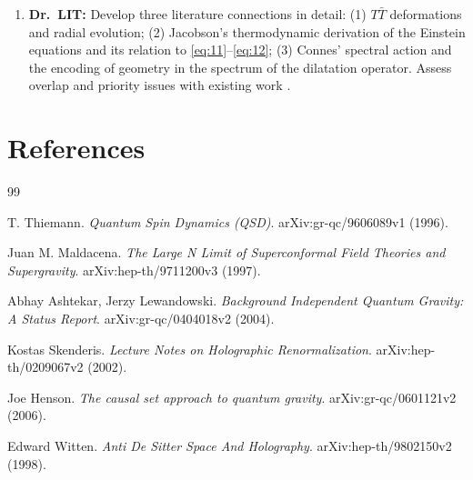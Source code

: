 \documentclass[11pt,a4paper]{article}
\begin{document}
\begin{enumerate}
  \item \textbf{Dr.\ LIT:}
    Develop three literature connections in detail:
    (1) $T\bar{T}$ deformations and radial evolution;
    (2) Jacobson's thermodynamic derivation of the Einstein equations and its
    relation to \eqref{eq:11}--\eqref{eq:12};
    (3) Connes' spectral action and the encoding of geometry in the spectrum
    of the dilatation operator.
    Assess overlap and priority issues with existing work
    \cite{skenderis2002,witten1998}.
\end{enumerate}

\section*{References}

\begin{thebibliography}{99}

T. Thiemann.
\textit{Quantum Spin Dynamics (QSD)}.
arXiv:gr-qc/9606089v1 (1996).

Juan M. Maldacena.
\textit{The Large N Limit of Superconformal Field Theories and Supergravity}.
arXiv:hep-th/9711200v3 (1997).

Abhay Ashtekar, Jerzy Lewandowski.
\textit{Background Independent Quantum Gravity: A Status Report}.
arXiv:gr-qc/0404018v2 (2004).

Kostas Skenderis.
\textit{Lecture Notes on Holographic Renormalization}.
arXiv:hep-th/0209067v2 (2002).

Joe Henson.
\textit{The causal set approach to quantum gravity}.
arXiv:gr-qc/0601121v2 (2006).

Edward Witten.
\textit{Anti De Sitter Space And Holography}.
arXiv:hep-th/9802150v2 (1998).

\end{thebibliography}
\end{document}
